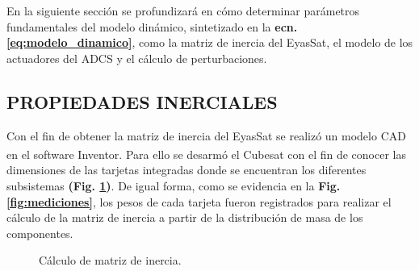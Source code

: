 En la siguiente sección se profundizará en cómo determinar parámetros fundamentales del modelo dinámico, sintetizado en la \textbf{ecn.\eqref{eq:modelo_dinamico}}, como la matriz de inercia del EyasSat, el modelo de los actuadores del ADCS y el cálculo de perturbaciones. 

\subsection{PROPIEDADES INERCIALES}


Con el fin de obtener la matriz de inercia del EyasSat se realizó un modelo CAD en el software Inventor\textsuperscript{\tiny\textregistered}. Para ello se desarmó el Cubesat con el fin de conocer las dimensiones de las tarjetas integradas donde se encuentran los diferentes subsistemas \textbf{(Fig. \ref{fig:eyassat_lab})}. De igual forma, como se evidencia en la \textbf{Fig. \ref{fig:mediciones}}, los pesos de cada tarjeta fueron registrados para realizar el cálculo de la matriz de inercia a partir de la distribución de masa de los componentes.


\begin{figure}[h]
	\centering
	
	\caption{Cálculo de matriz de inercia.}
	\label{fig:eyassat_lab}
\end{figure}

